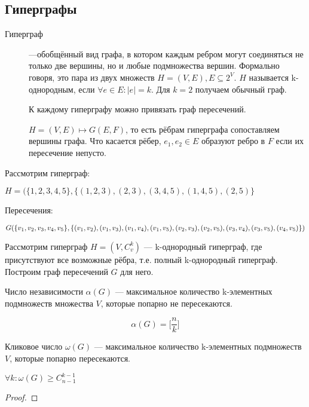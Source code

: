 \subsection{Гиперграфы}

\begin{description}
\item[Гиперграф] ---обобщённый вид графа, в котором каждым ребром могут соединяться не только две вершины, но и любые подмножества вершин. Формально говоря, это пара из двух множеств $H = (V, E), E \subseteq 2^V$. $H$ называется k-однородным, если $\forall e \in E : |e| = k$. Для $k=2$ получаем обычный граф.

К каждому гиперграфу можно привязать граф пересечений. 

$H=(V,E) \mapsto G(E,F)$, то есть рёбрам гиперграфа сопоставляем вершины графа. Что касается рёбер, $e_1 ,e_2 \in E$ образуют ребро в $F$ если их пересечение непусто.

\end{description}
 
\begin{example}

Рассмотрим гиперграф:

$H = ( \{ 1,2,3,4,5\}, \{ (1,2,3), (2,3), (3,4,5), (1,4,5), (2,5)\}$

Пересечения:

$G(\{v_1, v_2, v_3, v_4, v_5\}, \{(v_1,v_2), (v_1,v_3), (v_1,v_4), (v_1,v_5), (v_2, v_3),(v_2,v_5),(v_3,v_4), \\
(v_3,v_5), (v_4,v_5)\})$

\end{example}


Рассмотрим гиперграф $H = (V, C^k_v) $ --- k-однородный гиперграф, где присутствуют все возможные рёбра, т.е. полный k-однородный гиперграф. Построим граф пересечений $G$ для него. 

Число независимости $\alpha(G) $ --- максимальное количество k-элементных подмножеств множества $V$, которые попарно не пересекаются.
 
 \[ \alpha(G) = \bigg[ \frac n k \bigg] \]


Кликовое число $\omega (G)$ --- максимальное количество k-элементных подмножеств $V$, которые попарно пересекаются.

$\forall k : \omega(G) \geq C^{k-1} _{n-1}$
 
\begin{proof}

\end{proof}

